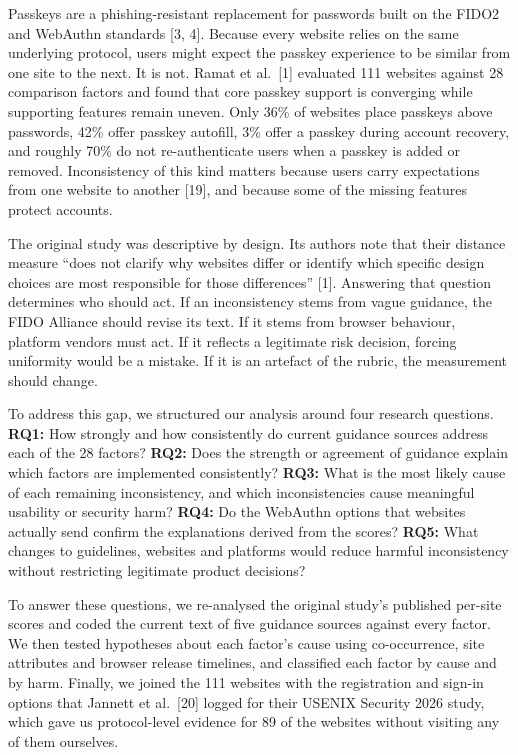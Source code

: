 \documentclass[letterpaper,twocolumn,10pt]{article}
\begin{document}
Passkeys are a phishing-resistant replacement for passwords built on the FIDO2 and WebAuthn standards {[}3, 4{]}. Because every website relies on the same underlying protocol, users might expect the passkey experience to be similar from one site to the next. It is not. Ramat et al.~{[}1{]} evaluated 111 websites against 28 comparison factors and found that core passkey support is converging while supporting features remain uneven. Only 36\% of websites place passkeys above passwords, 42\% offer passkey autofill, 3\% offer a passkey during account recovery, and roughly 70\% do not re-authenticate users when a passkey is added or removed. Inconsistency of this kind matters because users carry expectations from one website to another {[}19{]}, and because some of the missing features protect accounts.

The original study was descriptive by design. Its authors note that their distance measure ``does not clarify why websites differ or identify which specific design choices are most responsible for those differences'' {[}1{]}. Answering that question determines who should act. If an inconsistency stems from vague guidance, the FIDO Alliance should revise its text. If it stems from browser behaviour, platform vendors must act. If it reflects a legitimate risk decision, forcing uniformity would be a mistake. If it is an artefact of the rubric, the measurement should change.

To address this gap, we structured our analysis around four research questions. \textbf{RQ1:} How strongly and how consistently do current guidance sources address each of the 28 factors? \textbf{RQ2:} Does the strength or agreement of guidance explain which factors are implemented consistently? \textbf{RQ3:} What is the most likely cause of each remaining inconsistency, and which inconsistencies cause meaningful usability or security harm? \textbf{RQ4:} Do the WebAuthn options that websites actually send confirm the explanations derived from the scores? \textbf{RQ5:} What changes to guidelines, websites and platforms would reduce harmful inconsistency without restricting legitimate product decisions?

To answer these questions, we re-analysed the original study's published per-site scores and coded the current text of five guidance sources against every factor. We then tested hypotheses about each factor's cause using co-occurrence, site attributes and browser release timelines, and classified each factor by cause and by harm. Finally, we joined the 111 websites with the registration and sign-in options that Jannett et al.~{[}20{]} logged for their USENIX Security 2026 study, which gave us protocol-level evidence for 89 of the websites without visiting any of them ourselves.
\end{document}
